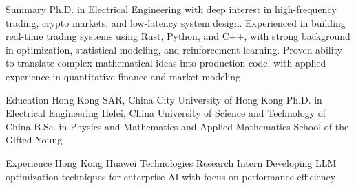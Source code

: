 \documentclass[caps, english]{financecv}
\begin{document}
\begin{cvsection}{Summary}
    Ph.D. in Electrical Engineering with deep interest in high-frequency trading, crypto markets, and low-latency system design. Experienced in building real-time trading systems using Rust, Python, and C++, with strong background in optimization, statistical modeling, and reinforcement learning. Proven ability to translate complex mathematical ideas into production code, with applied experience in quantitative finance and market modeling.
\end{cvsection}

\begin{cvsection}{Education}
    {Hong Kong SAR, China}
    {City University of Hong Kong}
    {}
    {Ph.D. in Electrical Engineering}
    {}
    {}
    {}
    {Hefei, China}
    {University of Science and Technology of China}
    {}
    {B.Sc. in Physics and Mathematics and Applied Mathematics}
    {School of the Gifted Young}
    {}
    {}
\end{cvsection}

\begin{cvsection}{Experience}
    {Hong Kong}
    {Huawei Technologies}
    {Research Intern}
    {Developing LLM optimization techniques for enterprise AI with focus on performance efficiency}
    {}
    {}
    {}
\end{cvsection}
\end{document}
